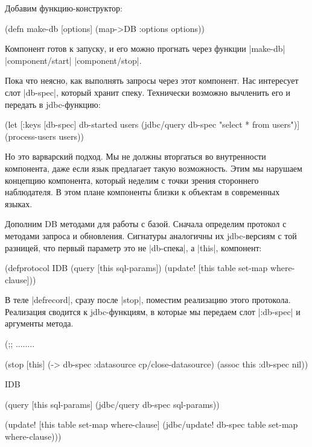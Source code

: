Добавим функцию-конструктор:

\begin{code}
(defn make-db [options]
  (map->DB {:options options}))
\end{code}

Компонент готов к запуску, и его можно прогнать через функции \spverb|make-db| %
\spverb|component/start| %
\spverb|component/stop|.

Пока что неясно, как выполнять запросы через этот компонент. Нас интересует слот
\spverb|db-spec|, который хранит спеку. Технически возможно вычленить его и передать в
jdbc-функцию:

\begin{code}
(let [{:keys [db-spec]} db-started
      users (jdbc/query db-spec "select * from users")]
  (process-users users))
\end{code}

Но это варварский подход. Мы не должны вторгаться во внутренности компонента,
даже если язык предлагает такую возможность. Этим мы нарушаем концепцию
компонента, который неделим с точки зрения стороннего наблюдателя. В этом плане
компоненты близки к объектам в современных языках.

Дополним DB методами для работы с базой. Сначала определим протокол с методами
запроса и обновления. Сигнатуры аналогичны их jdbc-версиям с той разницей, что
первый параметр это не \spverb|db-спека|, а \spverb|this|, компонент:

\begin{code}
(defprotocol IDB
  (query [this sql-params])
  (update! [this table set-map where-clause]))
\end{code}

В теле \spverb|defrecord|, сразу после \spverb|stop|, поместим реализацию этого
протокола. Реализация сводится к jdbc-функциям, в которые мы передаем слот
\spverb|:db-spec| и аргументы метода.

\begin{code}
(;; ........

  (stop [this]
    (-> db-spec :datasource cp/close-datasource)
      (assoc this :db-spec nil))

  IDB

  (query [this sql-params]
    (jdbc/query db-spec sql-params))

  (update! [this table set-map where-clause]
    (jdbc/update! db-spec table set-map where-clause)))
\end{code}

